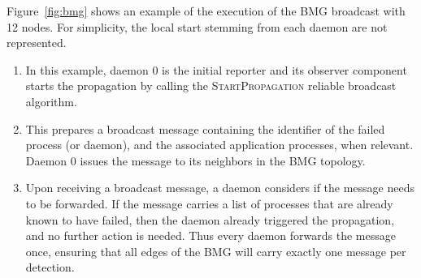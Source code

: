 \documentclass[sigconf]{acmart}
\begin{document}
Figure~\ref{fig:bmg} shows an example of the execution of the BMG broadcast
with 12 nodes. For simplicity, the local start stemming from each daemon are not
represented.

\begin{enumerate}
 \item In this example, daemon 0 is the initial reporter and its observer component starts the propagation by calling the \textsc{StartPropagation} reliable broadcast algorithm.
 \item This prepares a broadcast message containing the identifier of the
 failed process (or daemon), and the associated application processes, when relevant.
 Daemon 0 issues the message to its neighbors in the BMG topology.
 \item Upon receiving a broadcast message, a daemon considers if the message needs
 to be forwarded. If the message carries a list of processes that are already known to
 have failed, then the daemon already triggered the propagation, and no further
 action is needed. Thus every daemon forwards the message once, ensuring that
 all edges of the BMG will carry exactly one message per detection.
\end{enumerate}
\end{document}
